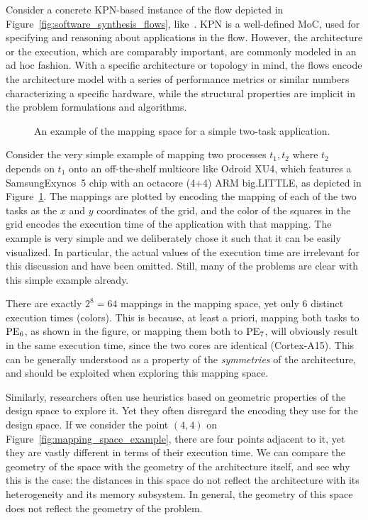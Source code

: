 Consider a concrete \ac{KPN}-based instance of the flow depicted in Figure~\ref{fig:software_synthesis_flows}, like~\cite{maps,sesame,thiele2007DOL}.
\ac{KPN} is a well-defined \ac{MoC}, used for specifying and reasoning about applications in the flow.
However, the architecture or the execution, which are comparably important, are commonly modeled in an ad hoc fashion.
With a specific architecture or topology in mind, the flows encode the architecture model with a series of performance metrics or similar numbers characterizing a specific hardware, while the structural properties are implicit in the problem formulations and algorithms.

\begin{figure}[h]
	\centering
\resizebox{0.95\textwidth}{!}{
   \begin{tikzpicture}
     
   \end{tikzpicture}
 }
   \caption{An example of the mapping space for a simple two-task application.}
   \label{fig:mapping_space_motivation}
\end{figure}


Consider the very simple example of mapping two processes $t_1,t_2$ where $t_2$ depends on $t_1$ onto an off-the-shelf multicore like Odroid XU4, which features a Samsung\texttrademark Exynos~5 chip with an octacore (4+4) ARM big.LITTLE\texttrademark, as depicted in Figure~\ref{fig:mapping_space_motivation}.
The mappings are plotted by encoding the mapping of each of the two tasks as the $x$ and $y$ coordinates of the grid, and the color of the squares in the grid encodes the execution time of the application with that mapping.
The example is very simple and we deliberately chose it such that it can be easily visualized.
In particular, the actual values of the execution time are irrelevant for this discussion and have been omitted.
Still, many of the problems are clear with this simple example already.

There are exactly $2^8 = 64$ mappings in the mapping space, yet only 6 distinct execution times (colors).
This is because, at least a priori, mapping both tasks to $\operatorname{PE}_6$, as shown in the figure, or mapping them both to $\operatorname{PE}_7$, will obviously result in the same execution time, since the two cores are identical (Cortex-A15\texttrademark).
This can be generally understood as a property of the \emph{symmetries} of the architecture, and should be exploited when exploring this mapping space.

Similarly, researchers often use heuristics based on geometric properties of the design space to explore it.
Yet they often disregard the encoding they use for the design space.
If we consider the point $(4,4)$ on Figure~\ref{fig:mapping_space_example}, there are four points adjacent to it, yet they are vastly different in terms of their execution time.
We can compare the geometry of the space with the geometry of the architecture itself, and see why this is the case: the distances in this space do not reflect the architecture with its heterogeneity and its memory subsystem.
In general, the geometry of this space does not reflect the geometry of the problem. 


